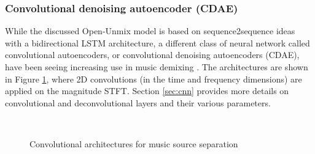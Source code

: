 \documentclass[report.tex]{subfiles}
\begin{document}
\newpagefill

\subsubsection{Convolutional denoising autoencoder (CDAE)}
\label{sec:cdae}

While the discussed Open-Unmix model is based on sequence2sequence ideas with a bidirectional LSTM architecture, a different class of neural network called convolutional autoencoders, or convolutional denoising autoencoders (CDAE), have been seeing increasing use in music demixing \parencite{plumbley1, plumbley2}. The architectures are shown in Figure \ref{fig:cdaes}, where 2D convolutions (in the time and frequency dimensions) are applied on the magnitude STFT. Section \ref{sec:cnn} provides more details on convolutional and deconvolutional layers and their various parameters.

\begin{figure}[ht]
	\centering
	\\
	\caption{Convolutional architectures for music source separation}
	\label{fig:cdaes}
\end{figure}
\end{document}
